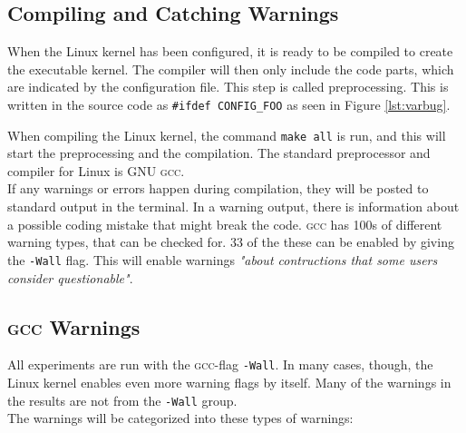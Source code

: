 \documentclass[a4paper,11pt]{report}
\newcommand{\textcode}[1]{\fboxsep=1pt\texttt{\colorbox{gray!20}{#1}}}
\begin{document}
            \subsection{Compiling and Catching Warnings}

When the Linux kernel has been configured, it is ready to be compiled to create 
the executable kernel. The compiler will then only include the code parts, 
which are indicated by the configuration file. This step is called preprocessing. This is written in the source 
code as \textcode{\#ifdef CONFIG\_FOO} as seen in Figure \ref{lst:varbug}.

When compiling the Linux kernel, the command \textcode{make all} is run, and 
this will start the preprocessing and the compilation. The standard preprocessor and compiler for Linux is \textsc{GNU gcc}. 
\\

If any warnings or errors happen during compilation, they will be posted to standard output in the terminal.
In a warning output, there is information about a possible coding mistake that 
might break the code. \textsc{gcc} has 100s of different warning types, that can be 
checked for. 33 of the these can be enabled by giving the \textcode{-Wall} flag.
 This will enable warnings \emph{"about contructions that some users consider 
questionable"}\cite{gccwarnings}.



            \subsection{\textsc{gcc} Warnings}
            \label{sec:gccwarns}
All experiments are run with the \textsc{gcc}-flag \textcode{-Wall}. In many 
cases, though, the Linux kernel enables even more warning flags by itself.
Many of the warnings in the results are not from the \texttt{-Wall} group.
\\

The warnings will be categorized into these types of warnings:
\end{document}
